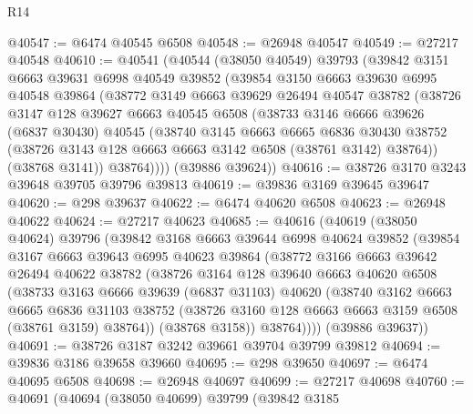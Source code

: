 \begin{lexlean}{R14}
\begin{coremodule}
@40547 := @6474 @40545 @6508
@40548 := @26948 @40547
@40549 := @27217 @40548
@40610 := @40541
    (@40544
      (@38050 @40549)
      @39793
      (@39842
        @3151
        @6663
        @39631
        @6998
        @40549
        @39852
        (@39854
          @3150
          @6663
          @39630
          @6995
          @40548
          @39864
          (@38772
            @3149
            @6663
            @39629
            @26494
            @40547
            @38782
            (@38726
              @3147
              @128
              @39627
              @6663
              @40545
              @6508
              (@38733
                @3146
                @6666
                @39626
                (@6837 @30430)
                @40545
                (@38740
                  @3145
                  @6663
                  @6665
                  @6836
                  @30430
                  @38752
                  (@38726 @3143 @128 @6663 @6663 @3142 @6508 (@38761 @3142) @38764))
                (@38768 @3141))
              @38764))))
      (@39886 @39624))
@40616 := @38726 @3170 @3243 @39648 @39705 @39796 @39813
@40619 := @39836 @3169 @39645 @39647
@40620 := @298 @39637
@40622 := @6474 @40620 @6508
@40623 := @26948 @40622
@40624 := @27217 @40623
@40685 := @40616
    (@40619
      (@38050 @40624)
      @39796
      (@39842
        @3168
        @6663
        @39644
        @6998
        @40624
        @39852
        (@39854
          @3167
          @6663
          @39643
          @6995
          @40623
          @39864
          (@38772
            @3166
            @6663
            @39642
            @26494
            @40622
            @38782
            (@38726
              @3164
              @128
              @39640
              @6663
              @40620
              @6508
              (@38733
                @3163
                @6666
                @39639
                (@6837 @31103)
                @40620
                (@38740
                  @3162
                  @6663
                  @6665
                  @6836
                  @31103
                  @38752
                  (@38726 @3160 @128 @6663 @6663 @3159 @6508 (@38761 @3159) @38764))
                (@38768 @3158))
              @38764))))
      (@39886 @39637))
@40691 := @38726 @3187 @3242 @39661 @39704 @39799 @39812
@40694 := @39836 @3186 @39658 @39660
@40695 := @298 @39650
@40697 := @6474 @40695 @6508
@40698 := @26948 @40697
@40699 := @27217 @40698
@40760 := @40691
    (@40694
      (@38050 @40699)
      @39799
      (@39842
        @3185

\end{coremodule}
\end{lexlean}
